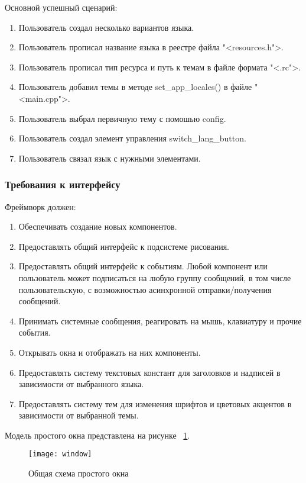 Основной успешный сценарий:
\begin{enumerate}
	\item Пользователь создал несколько вариантов языка.
	\item Пользователь прописал название языка в реестре файла "<resources.h">.
	\item Пользователь прописал тип ресурса и путь к темам в файле формата "<.rc">.
	\item Пользователь добавил темы в методе set{\_}app{\_}locales() в файле "<main.cpp">.
	\item Пользователь выбрал первичную тему с помошью config.
	\item Пользователь создал элемент управления switch{\_}lang{\_}button.
	\item Пользователь связал язык с нужными элементами.
\end{enumerate}

\subsubsection{Требования к интерфейсу}
Фреймворк должен:
\begin{enumerate}
	\item Обеспечивать создание новых компонентов.
	\item Предоставлять общий интерфейс к подсистеме рисования.
	\item Предоставлять общий интерфейс к событиям. Любой компонент или пользователь может подписаться на любую группу сообщений, в том числе пользовательскую, с возможностью асинхронной отправки/получения сообщений.
	\item Принимать системные сообщения, реагировать на мышь, клавиатуру и прочие события.
	\item Открывать окна и отображать на них компоненты.
    \item Предоставлять систему текстовых констант для заголовков и надписей в зависимости от выбранного языка.
    \item Предоставлять систему тем для изменения шрифтов и цветовых акцентов в зависимости от выбранной темы.
\end{enumerate}

Модель простого окна представлена на рисунке ~\ref{window:image}.

\begin{figure}[ht]
\texttt{[image: window]}
\caption{Общая схема простого окна}
\label{window:image}
\end{figure}

